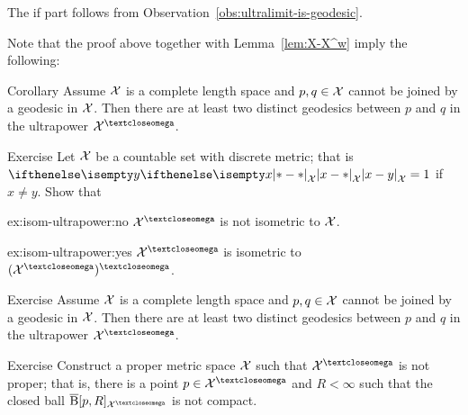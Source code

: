 The if part follows from Observation~\ref{obs:ultralimit-is-geodesic}.
\qeds

Note that the proof above together with Lemma~\ref{lem:X-X^w} imply the following:

\begin{thm}{Corollary}\label{cor:two-geodesics-in-ultrapower}
Assume $\mathcal{X}$ is a complete length space 
and $p,q\in\spc{X}$ cannot be joined by a geodesic in $\mathcal{X}$.  
Then there are at least two distinct geodesics between $p$ and $q$ 
in the ultrapower $\spc{X}^\o$.
\end{thm}

\begin{thm}{Exercise}\label{ex:isom-ultrapower}
Let $\mathcal{X}$ be a countable set with discrete metric;
that is $\dist{x}{y}{\spc{X}}=1$ if $x\ne y$.
Show that 

\begin{subthm}{ex:isom-ultrapower:no}
$\spc{X}^\o$ is not isometric to $\mathcal{X}$.
\end{subthm}

\begin{subthm}{ex:isom-ultrapower:yes}
$\spc{X}^\o$ is  isometric to $(\spc{X}^\o)^\o$.
\end{subthm}

\end{thm}

\begin{thm}{Exercise}\label{ex:two-geodesics-in-ultrapower}
Assume $\mathcal{X}$ is a complete length space 
and $p,q\in\spc{X}$ cannot be joined by a geodesic in $\mathcal{X}$.  
Then there are at least two distinct geodesics between $p$ and $q$ 
in the ultrapower $\spc{X}^\o$.
\end{thm}

\begin{thm}{Exercise}\label{ex:notproper-limit}
Construct a proper metric space $\mathcal{X}$ such that $\spc{X}^\o$ is not proper;
that is, there is a point $p\in \spc{X}^\o$ and $R<\infty$ such that the closed ball $\cBall[p,R]_{\spc{X}^\o}$ is not compact.
\end{thm}

